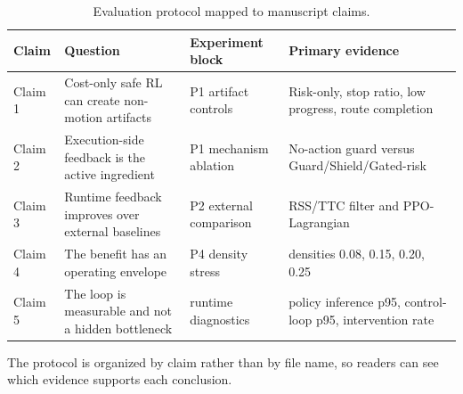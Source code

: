 
\begin{table}[t]
\centering
\caption{Evaluation protocol mapped to manuscript claims.}
\label{tab_protocol_claim_map}
\footnotesize
\setlength{\tabcolsep}{3.4pt}
\renewcommand{\arraystretch}{1.08}
\begin{tabular}{@{}>{\raggedright\arraybackslash}p{}>{\raggedright\arraybackslash}p{}>{\raggedright\arraybackslash}p{}>{\raggedright\arraybackslash}p{}@{}}
\toprule
Claim & Question & Experiment block & Primary evidence \\
\midrule
Claim 1 & Cost-only safe RL can create non-motion artifacts & P1 artifact controls & Risk-only, stop ratio, low progress, route completion \\
Claim 2 & Execution-side feedback is the active ingredient & P1 mechanism ablation & No-action guard versus Guard/Shield/Gated-risk \\
Claim 3 & Runtime feedback improves over external baselines & P2 external comparison & RSS/TTC filter and PPO-Lagrangian \\
Claim 4 & The benefit has an operating envelope & P4 density stress & densities 0.08, 0.15, 0.20, 0.25 \\
Claim 5 & The loop is measurable and not a hidden bottleneck & runtime diagnostics & policy inference p95, control-loop p95, intervention rate \\
\bottomrule
\end{tabular}
\begin{tablenotes}
\item The protocol is organized by claim rather than by file name, so readers can see which evidence supports each conclusion.
\end{tablenotes}
\end{table}

